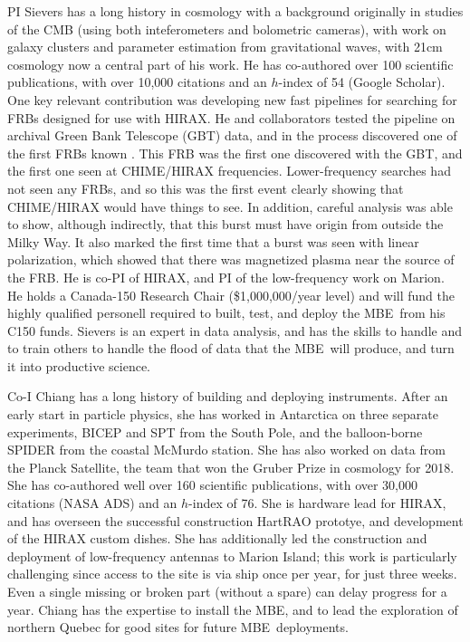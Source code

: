 \documentclass[letterpaper,11pt,preprint]{aastex}
\makeatletter
\newcommand{\mbe}{{\rm MBE}}
\def\section{\@startsection {section}{1}{\z@}{1.0ex plus 
1ex minus .2ex}{.2ex plus .2ex}{\large\bf}}
\makeatother
\begin{document}
\section{Researchers}
PI Sievers has a long history in cosmology with a background
originally in studies of the CMB (using both inteferometers and
bolometric cameras), with work on galaxy clusters and parameter
estimation from gravitational waves, with 21cm cosmology now a central
part of his work.  He has co-authored over 100 scientific
publications, with over 10,000 citations and an $h$-index of 54
(Google Scholar).  One key relevant contribution was developing new
fast pipelines for searching for FRBs designed for use with HIRAX.  He
and collaborators tested the pipeline on archival Green Bank Telescope
(GBT) data, and in the process discovered one of the first FRBs known
\citep{Masui15}.  This FRB was the first one discovered with the GBT,
and the first one seen at CHIME/HIRAX frequencies.  Lower-frequency
searches had not seen any FRBs, and so this was the first event
clearly showing that CHIME/HIRAX would have things to see.  In
addition, careful analysis was able to show, although indirectly, that
this burst must have origin from outside the Milky Way.  It also
marked the first time that a burst was seen with linear polarization,
which showed that there was magnetized plasma near the source of the
FRB.  He is co-PI of HIRAX, and PI of the low-frequency work on
Marion.  He holds a Canada-150 Research Chair (\$1,000,000/year level)
and will fund the highly qualified personell required to built, test,
and deploy the \mbe\ from his C150 funds.  Sievers is an expert in
data analysis, and has the skills to handle and to train others to
handle the flood of data that the \mbe\ will produce, and turn it into
productive science.

Co-I Chiang has a long history of building and deploying instruments.
After an early start in particle physics, she has worked in Antarctica
on three separate experiments, BICEP and SPT from the South Pole, and
the balloon-borne SPIDER from the coastal McMurdo station.  She has
also worked on data from the Planck Satellite, the team that won the
Gruber Prize in cosmology for 2018.  She has co-authored well over 160
scientific publications, with over 30,000 citations (NASA ADS) and an
$h$-index of 76.  She is hardware lead for HIRAX, and has overseen the
successful construction HartRAO prototye, and development of the HIRAX
custom dishes.  She has additionally led the construction and
deployment of low-frequency antennas to Marion Island; this work is
particularly challenging since access to the site is via ship once per
year, for just three weeks.  Even a single missing or broken part
(without a spare) can delay progress for a year.  Chiang has the
expertise to install the \mbe, and to lead the exploration of northern
Quebec for good sites for future \mbe\ deployments.
\end{document}
